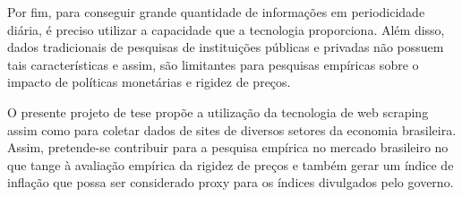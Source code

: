Por fim, para conseguir grande quantidade de informações em periodicidade diária, é preciso utilizar a capacidade que a tecnologia proporciona. Além disso, dados tradicionais de pesquisas de instituições públicas e privadas não possuem tais características e assim, são limitantes para pesquisas empíricas sobre o impacto de políticas monetárias e rigidez de preços.

O presente projeto de tese propõe a utilização da tecnologia de web scraping assim como \citet{cavallo2010scraped} para coletar dados de sites de diversos setores da economia brasileira. Assim, pretende-se contribuir para a pesquisa empírica no mercado brasileiro no que tange à avaliação empírica da rigidez de preços e também gerar um índice de inflação que possa ser considerado proxy para os índices divulgados pelo governo. 

